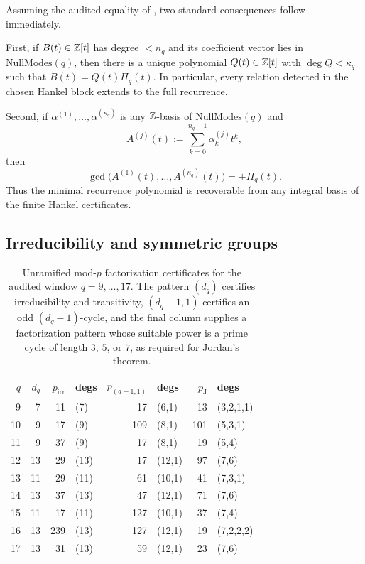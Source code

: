 \begin{remark}
\label{rem:principalization-consequences}
Assuming the audited equality of , two
standard consequences follow immediately.

First, if \(B(t)\in\mathbb{Z}[t]\) has degree \(<n_q\) and its coefficient vector lies
in \(\mathrm{NullModes}(q)\), then there is a unique polynomial \(Q(t)\in\mathbb{Z}[t]\)
with \(\deg Q<\kappa_q\) such that \(B(t)=Q(t)\Pi_q(t)\).  In particular, every
relation detected in the chosen Hankel block extends to the full recurrence.

Second, if \(\alpha^{(1)},\dots,\alpha^{(\kappa_q)}\) is any \(\mathbb{Z}\)-basis of
\(\mathrm{NullModes}(q)\) and
\[
  A^{(j)}(t):=\sum_{k=0}^{n_q-1}\alpha_k^{(j)}t^k,
\]
then
\[
  \gcd\bigl(A^{(1)}(t),\dots,A^{(\kappa_q)}(t)\bigr)=\pm \Pi_q(t).
\]
Thus the minimal recurrence polynomial is recoverable from any integral basis
of the finite Hankel certificates.
\end{remark}

\subsection{Irreducibility and symmetric groups}

\begin{table}[t]
\centering
\scriptsize
\setlength{\tabcolsep}{5pt}
\caption{Unramified mod-\(p\) factorization certificates for the audited window
\(q=9,\dots,17\).  The pattern \((d_q)\) certifies irreducibility and
transitivity, \((d_q-1,1)\) certifies an odd \((d_q-1)\)-cycle, and the final
column supplies a factorization pattern whose suitable power is a prime cycle
of length \(3\), \(5\), or \(7\), as required for Jordan's theorem.}
\label{tab:galois-certificates-q9-17}
\begin{tabular}{r r r l r l r l}
\toprule
\(q\) & \(d_q\) & \(p_{\mathrm{irr}}\) & degs & \(p_{(d-1,1)}\) & degs & \(p_{\mathrm{J}}\) & degs\\
\midrule
9  & 7  & 11  & (7)  & 17  & (6,1)   & 13 & (3,2,1,1) \\
10 & 9  & 17  & (9)  & 109 & (8,1)   & 101 & (5,3,1) \\
11 & 9  & 37  & (9)  & 17  & (8,1)   & 19 & (5,4) \\
12 & 13 & 29  & (13) & 17  & (12,1)  & 97 & (7,6) \\
13 & 11 & 29  & (11) & 61  & (10,1)  & 41 & (7,3,1) \\
14 & 13 & 37  & (13) & 47  & (12,1)  & 71 & (7,6) \\
15 & 11 & 17  & (11) & 127 & (10,1)  & 37 & (7,4) \\
16 & 13 & 239 & (13) & 127 & (12,1)  & 19 & (7,2,2,2) \\
17 & 13 & 31  & (13) & 59  & (12,1)  & 23 & (7,6) \\
\bottomrule
\end{tabular}
\end{table}

